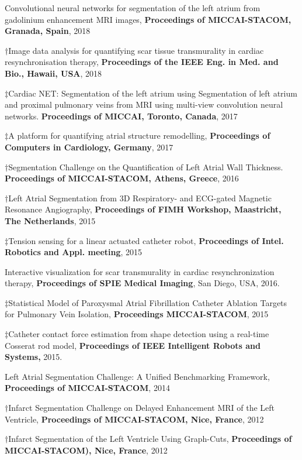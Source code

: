 \documentclass[letterpaper]{twentysecondcv} %
\begin{document}
\begin{etaremune} 
\item *Convolutional neural networks for segmentation of the left atrium from gadolinium enhancement MRI images, \textbf{Proceedings of MICCAI-STACOM, Granada, Spain}, 2018 
\item $\dagger$Image data analysis for quantifying scar tissue transmurality in cardiac resynchronisation therapy, \textbf{Proceedings of the IEEE Eng. in Med. and Bio., Hawaii, USA}, 2018
\item $\ddagger$Cardiac NET: Segmentation of the left atrium using Segmentation of left atrium and proximal pulmonary veins from MRI using multi-view convolution neural networks. \textbf{Proceedings of MICCAI, Toronto, Canada}, 2017
\item $\ddagger$A platform for quantifying atrial structure remodelling, \textbf{Proceedings of Computers in Cardiology, Germany}, 2017
\item $\dagger$Segmentation Challenge on the Quantification of Left Atrial Wall Thickness. \textbf{Proceedings of MICCAI-STACOM, Athens, Greece}, 2016
\item $\dagger$Left Atrial Segmentation from 3D Respiratory- and ECG-gated Magnetic Resonance Angiography, \textbf{Proceedings of FIMH Workshop, Maastricht, The Netherlands}, 2015 
	\item $\ddagger$Tension sensing for a linear actuated catheter robot, \textbf{Proceedings of Intel. Robotics and Appl. meeting}, 2015
	\item Interactive visualization for scar transmurality in cardiac resynchronization therapy, \textbf{Proceedings of SPIE Medical Imaging}, San Diego, USA, 2016. 
	\item $\ddagger$Statistical Model of Paroxysmal Atrial Fibrillation Catheter Ablation Targets for Pulmonary Vein Isolation, \textbf{Proceedings MICCAI-STACOM}, 2015
	\item $\ddagger$Catheter contact force estimation from shape detection using a real-time Cosserat rod model, \textbf{Proceedings of IEEE Intelligent Robots and Systems,} 2015.
	\item Left Atrial Segmentation Challenge: A Unified Benchmarking Framework, \textbf{Proceedings of MICCAI-STACOM}, 2014
	\item $\dagger$Infarct Segmentation Challenge on Delayed Enhancement MRI of the Left Ventricle, \textbf{Proceedings of MICCAI-STACOM, Nice, France}, 2012 
	\item $\dagger$Infarct Segmentation of the Left Ventricle Using Graph-Cuts, \textbf{Proceedings of MICCAI-STACOM), Nice, France}, 2012

\end{etaremune}
\end{document}
